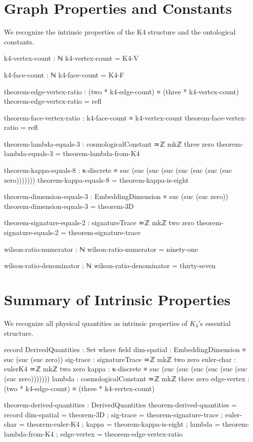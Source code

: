 \documentclass[11pt,a4paper]{book}
\begin{document}
\section{Graph Properties and Constants}

We recognize the intrinsic properties of the K4 structure and the ontological constants.

\begin{code}
k4-vertex-count : ℕ
k4-vertex-count = K4-V

k4-face-count : ℕ
k4-face-count = K4-F

theorem-edge-vertex-ratio : (two * k4-edge-count) ≡ (three * k4-vertex-count)
theorem-edge-vertex-ratio = refl

theorem-face-vertex-ratio : k4-face-count ≡ k4-vertex-count
theorem-face-vertex-ratio = refl

theorem-lambda-equals-3 : cosmologicalConstant ≃ℤ mkℤ three zero
theorem-lambda-equals-3 = theorem-lambda-from-K4

theorem-kappa-equals-8 : κ-discrete ≡ suc (suc (suc (suc (suc (suc (suc (suc zero)))))))
theorem-kappa-equals-8 = theorem-kappa-is-eight

theorem-dimension-equals-3 : EmbeddingDimension ≡ suc (suc (suc zero))
theorem-dimension-equals-3 = theorem-3D

theorem-signature-equals-2 : signatureTrace ≃ℤ mkℤ two zero
theorem-signature-equals-2 = theorem-signature-trace

wilson-ratio-numerator : ℕ
wilson-ratio-numerator = ninety-one

wilson-ratio-denominator : ℕ  
wilson-ratio-denominator = thirty-seven
\end{code}

\section{Summary of Intrinsic Properties}

We recognize all physical quantities as intrinsic properties of $K_4$'s essential structure.

\begin{code}
record DerivedQuantities : Set where
  field
    dim-spatial    : EmbeddingDimension ≡ suc (suc (suc zero))
    sig-trace      : signatureTrace ≃ℤ mkℤ two zero
    euler-char     : eulerK4 ≃ℤ mkℤ two zero
    kappa          : κ-discrete ≡ suc (suc (suc (suc (suc (suc (suc (suc zero)))))))
    lambda         : cosmologicalConstant ≃ℤ mkℤ three zero
    edge-vertex    : (two * k4-edge-count) ≡ (three * k4-vertex-count)

theorem-derived-quantities : DerivedQuantities
theorem-derived-quantities = record
  { dim-spatial  = theorem-3D
  ; sig-trace    = theorem-signature-trace
  ; euler-char   = theorem-euler-K4
  ; kappa        = theorem-kappa-is-eight
  ; lambda       = theorem-lambda-from-K4
  ; edge-vertex  = theorem-edge-vertex-ratio
  }
\end{code}
\end{document}

